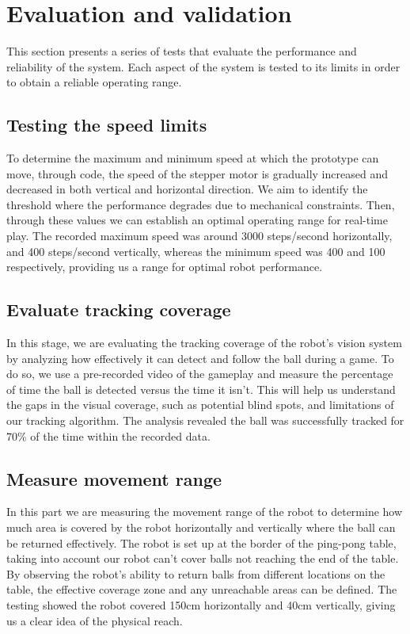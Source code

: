 \chapter{Evaluation and validation}
This section presents a series of tests that evaluate the performance and reliability of the system. Each aspect of the system is tested to its limits in order to obtain a reliable operating range.
\section{Testing the speed limits}
To determine the maximum and minimum speed at which the prototype can move, through code, the speed of the stepper motor is gradually increased and decreased in both vertical and horizontal direction. 
We aim to identify the threshold where the performance degrades due to mechanical constraints. 
Then, through these values we can establish an optimal operating range for real-time play. 
The recorded maximum speed was around 3000 steps/second horizontally, and 400 steps/second vertically, whereas the minimum speed was 400 and 100 respectively, providing us a range for optimal robot performance.

\section{Evaluate tracking coverage}
In this stage, we are evaluating the tracking coverage of the robot's vision system by analyzing how effectively it can detect and follow the ball during a game. 
To do so, we use a pre-recorded video of the gameplay and measure the percentage of time the ball is detected versus the time it isn't. 
This will help us understand the gaps in the visual coverage, such as potential blind spots, and limitations of our tracking algorithm. 
The analysis revealed the ball was successfully tracked for 70\% of the time within the recorded data.

\section{Measure movement range}
In this part we are measuring the movement range of the robot to determine how much area is covered by the robot horizontally and vertically where the ball can be returned effectively. 
The robot is set up at the border of the ping-pong table, taking into account our robot can't cover balls not reaching the end of the table. 
By observing the robot's ability to return balls from different locations on the table, the effective coverage zone and any unreachable areas can be defined. 
The testing showed the robot covered 150cm horizontally and 40cm vertically, giving us a clear idea of the physical reach.

